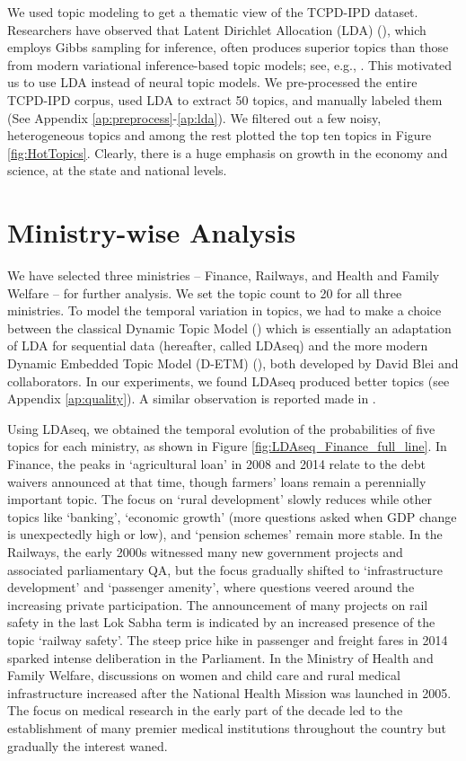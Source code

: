\documentclass[10pt, a4paper]{article}
\begin{document}
We used topic modeling to get a thematic view of the TCPD-IPD dataset. Researchers have observed that Latent Dirichlet Allocation (LDA) (\cite{blei2003latent}), which employs Gibbs sampling for inference, often produces superior topics than those from modern variational inference-based topic models; see, e.g.,  \cite{blei2017variational,lisena2020tomodapi}. This  motivated us to use LDA instead of neural topic models. We pre-processed the entire TCPD-IPD corpus, used LDA to extract 50 topics, and manually labeled them (See Appendix \ref{ap:preprocess}-\ref{ap:lda}).
We filtered out a few noisy, heterogeneous topics and among the rest plotted the top ten topics in Figure  \ref{fig:HotTopics}. Clearly, there is a huge emphasis on growth in the economy and science, at the state and national levels. 
\section{Ministry-wise Analysis}
\label{sec:ministrywise}
We have selected three ministries -- Finance, Railways, and Health and Family Welfare -- for further analysis. We set the topic count to 20 for all three ministries. 
To model the temporal variation in topics, we had to make a choice between the classical Dynamic Topic Model (\cite{blei2006dynamic}) which is essentially an adaptation of LDA  for sequential data (hereafter, called LDAseq) and the more modern Dynamic Embedded Topic Model (D-ETM) (\cite{DETM}), both developed by David Blei and collaborators.  
In our experiments, we found LDAseq produced better topics (see Appendix  \ref{ap:quality}). 
A similar observation is reported made in \cite{DETM}.  

Using LDAseq, we obtained the temporal evolution of the probabilities of five topics for each ministry, as shown in 
Figure \ref{fig:LDAseq_Finance_full_line}. In Finance, the peaks in `agricultural loan' in 2008 and 2014 relate to the debt waivers announced at that time, though farmers' loans remain a perennially important topic. The focus on `rural development' slowly reduces while other topics like `banking', `economic growth' (more questions asked when GDP change is unexpectedly high or low), and `pension schemes' remain more stable.
In the Railways, the early 2000s witnessed many new government projects and associated parliamentary QA, but the focus gradually shifted to `infrastructure development' and `passenger amenity', where questions veered around the increasing private participation. The announcement of many projects on rail safety in the last Lok Sabha term is indicated by an increased presence of the topic `railway safety'.
The steep price hike in passenger and freight fares in 2014 sparked intense deliberation in the Parliament.  
In the Ministry of Health and Family Welfare, discussions on women and child care and rural medical infrastructure increased after the National Health Mission was launched in 2005. The focus on medical research in the early part of the decade led to the establishment of many premier medical institutions throughout the country but gradually the interest waned.
\end{document}
